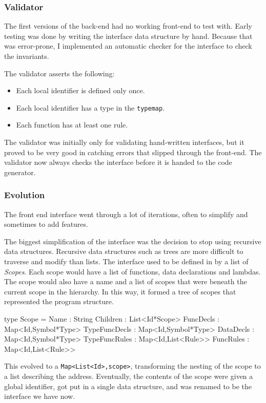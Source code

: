 \subsubsection{Validator}
The first versions of the back-end had no working front-end to test with.
Early testing was done by writing the interface data structure by hand.
Because that was error-prone, I implemented an automatic checker for the interface to check the invariants.

The validator asserts the following:
\begin{itemize}
\item Each local identifier is defined only once.
\item Each local identifier has a type in the \texttt{typemap}.
\item Each function has at least one rule.
\end{itemize}

The validator was initially only for validating hand-written interfaces,
but it proved to be very good in catching errors that slipped through the front-end.
The validator now always checks the interface before it is handed to the code generator.

\subsubsection{Evolution}
The front end interface went through a lot of iterations, often to simplify and sometimes to add features.

The biggest simplification of the interface was the decision to stop using recursive data structures.
Recursive data structures such as trees are more difficult to traverse and modify than lists.
The interface used to be defined in by a list of \textit{Scopes}.
Each scope would have  a list of functions, data declarations and lambdas.
The scope would also have a name and a list of scopes that were beneath the current scope in the hierarchy.
In this way, it formed a tree of scopes that represented the program structure.

\begin{FS}
type Scope = {
  Name          : String
  Children      : List<Id*Scope>
  FuncDecls     : Map<Id,Symbol*Type>
  TypeFuncDecls : Map<Id,Symbol*Type>
  DataDecls     : Map<Id,Symbol*Type>
  TypeFuncRules : Map<Id,List<Rule>>
  FuncRules     : Map<Id,List<Rule>>
}
\end{FS}

This evolved to a \verb|Map<List<Id>,scope>|, transforming the nesting of the scope to a list describing the address.
Eventually, the contents of the scope were given a global identifier, got put in a single data structure, and was renamed to be the interface we have now.
